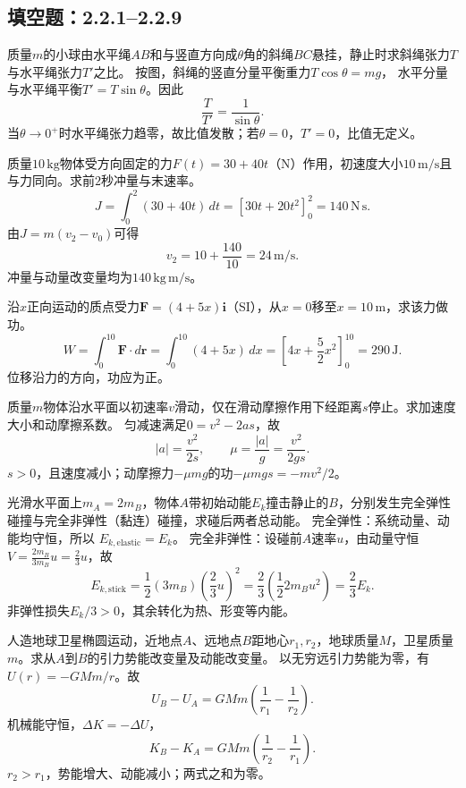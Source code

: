 
\subsection{填空题：2.2.1--2.2.9}
\problemtext 质量$m$的小球由水平绳$AB$和与竖直方向成$\theta$角的斜绳$BC$悬挂，静止时求斜绳张力$T$与水平绳张力$T'$之比。
\workings
按图，斜绳的竖直分量平衡重力$T\cos\theta=mg$，
水平分量与水平绳平衡$T'=T\sin\theta$。因此
\[
\boxed{\frac{T}{T'}=\frac1{\sin\theta}}.
\]
\crosscheck 当$\theta\to0^+$时水平绳张力趋零，故比值发散；若$\theta=0$，$T'=0$，比值无定义。

\problemtext 质量$10\,\mathrm{kg}$物体受方向固定的力$F(t)=30+40t$（N）作用，初速度大小$10\,\mathrm{m/s}$且与力同向。求前$2$秒冲量与末速率。
\workings
\[
J=\int_0^2(30+40t)\,dt=[30t+20t^2]_0^2
=\boxed{140\,\mathrm{N\,s}}.
\]
由$J=m(v_2-v_0)$可得
\[
\boxed{v_2=10+\frac{140}{10}=24\,\mathrm{m/s}}.
\]
\crosscheck 冲量与动量改变量均为$140\,\mathrm{kg\,m/s}$。

\problemtext 沿$x$正向运动的质点受力$\bm F=(4+5x)\bm i$（SI），从$x=0$移至$x=10\,\mathrm m$，求该力做功。
\workings
\[
W=\int_0^{10}\bm F\cdot d\bm r
=\int_0^{10}(4+5x)\,dx
=\left[4x+\frac52x^2\right]_0^{10}
=\boxed{290\,\mathrm J}.
\]
\crosscheck 位移沿力的方向，功应为正。

\problemtext 质量$m$物体沿水平面以初速率$v$滑动，仅在滑动摩擦作用下经距离$s$停止。求加速度大小和动摩擦系数。
\workings
匀减速满足$0=v^2-2as$，故
\[
\boxed{|a|=\frac{v^2}{2s}},\qquad
\mu=\frac{|a|}{g}=\boxed{\frac{v^2}{2gs}}.
\]
\crosscheck $s>0$，且速度减小；动摩擦力$-\mu mg$的功$-\mu mgs=-mv^2/2$。

\problemtext 光滑水平面上$m_A=2m_B$，物体$A$带初始动能$E_k$撞击静止的$B$，分别发生完全弹性碰撞与完全非弹性（黏连）碰撞，求碰后两者总动能。
\workings
完全弹性：系统动量、动能均守恒，所以
$\boxed{E_{k,\mathrm{elastic}}=E_k}$。
完全非弹性：设碰前$A$速率$u$，由动量守恒
$V=\frac{2m_B}{3m_B}u=\frac23u$，故
\[
E_{k,\mathrm{stick}}=\frac12(3m_B)\left(\frac23u\right)^2
=\frac23\left(\frac12 2m_Bu^2\right)
=\boxed{\frac23E_k}.
\]
\crosscheck 非弹性损失$E_k/3>0$，其余转化为热、形变等内能。

\problemtext 人造地球卫星椭圆运动，近地点$A$、远地点$B$距地心$r_1,r_2$，地球质量$M$，卫星质量$m$。求从$A$到$B$的引力势能改变量及动能改变量。
\workings
以无穷远引力势能为零，有$U(r)=-GMm/r$。故
\[
\boxed{U_B-U_A=GMm\left(\frac1{r_1}-\frac1{r_2}\right)}.
\]
机械能守恒，$\Delta K=-\Delta U$，
\[
\boxed{K_B-K_A=GMm\left(\frac1{r_2}-\frac1{r_1}\right)}.
\]
\crosscheck $r_2>r_1$，势能增大、动能减小；两式之和为零。

